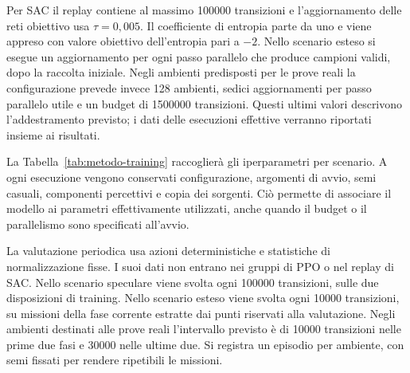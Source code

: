 Per SAC il replay contiene al massimo 100000 transizioni e l'aggiornamento delle reti obiettivo usa $\tau=0{,}005$. Il coefficiente di entropia parte da uno e viene appreso con valore obiettivo dell'entropia pari a $-2$. Nello scenario esteso si esegue un aggiornamento per ogni passo parallelo che produce campioni validi, dopo la raccolta iniziale. Negli ambienti predisposti per le prove reali la configurazione prevede invece 128 ambienti, sedici aggiornamenti per passo parallelo utile e un budget di 1500000 transizioni. Questi ultimi valori descrivono l'addestramento previsto; i dati delle esecuzioni effettive verranno riportati insieme ai risultati.

La Tabella~\ref{tab:metodo-training} raccoglierà gli iperparametri per scenario. A ogni esecuzione vengono conservati configurazione, argomenti di avvio, semi casuali, componenti percettivi e copia dei sorgenti. Ciò permette di associare il modello ai parametri effettivamente utilizzati, anche quando il budget o il parallelismo sono specificati all'avvio.

\begin{table}[tbp]
    \centering
    \caption[Iperparametri di addestramento]{Configurazioni di riferimento delle procedure PPO e SAC. I budget sono espressi in transizioni individuali; il numero di aggiornamenti per passo parallelo è distinto dal numero di robot che raccolgono dati.}
    \label{tab:metodo-training}
\end{table}

La valutazione periodica usa azioni deterministiche e statistiche di normalizzazione fisse. I suoi dati non entrano nei gruppi di PPO o nel replay di SAC. Nello scenario speculare viene svolta ogni 100000 transizioni, sulle due disposizioni di training. Nello scenario esteso viene svolta ogni 10000 transizioni, su missioni della fase corrente estratte dai punti riservati alla valutazione. Negli ambienti destinati alle prove reali l'intervallo previsto è di 10000 transizioni nelle prime due fasi e 30000 nelle ultime due. Si registra un episodio per ambiente, con semi fissati per rendere ripetibili le missioni.

